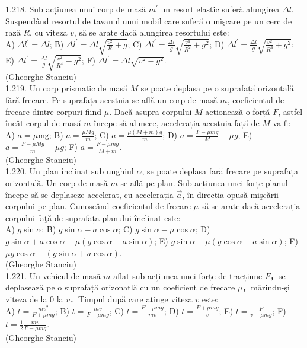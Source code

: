 {1.218. Sub acțiunea unui corp de masă $m^{\prime}$ un resort elastic suferă alungirea $\Delta l$. Suspendând resortul de tavanul unui mobil care suferă o mişcare pe un cerc de rază $R$, cu viteza $v$, să se arate dacă alungirea resortului este:\\ A) $\Delta l^{\prime}=\Delta l$; В) $\Delta l^{\prime}=\Delta l \sqrt{\frac{v^{2}}{R}+g}$; C) $\Delta l^{\prime}=\frac{\Delta l}{g} \sqrt{\frac{v^{4}}{R^{2}}+g^{2}}$; D) $\Delta l^{\prime}=\frac{\Delta l}{g} \sqrt{\frac{v^{2}}{R^{4}}+g^{2}}$; E) $\Delta l^{\prime}=\frac{\Delta l}{g} \sqrt{\frac{v^{2}}{R^{4}}-g^{2}}$; F) $\Delta l^{\prime}=\Delta l \sqrt{v^{2}-g^{2}}$.\\ (Gheorghe Stanciu)\\

1.219. Un corp prismatic de masă $M$ se poate deplasa pe o suprafață orizontală fără frecare. Pe suprafața acestuia se află un corp de masă $m$, coeficientul de frecare dintre corpuri fiind $\mu$. Dacă asupra corpului $M$ acționează o forță $F$, astfel încât corpul de masă $m$ începe să alunece, accelerația acestuia față de $M$ va fi:\\ A) $a=\mu \mathrm{mg}$; B) $a=\frac{\mu M g}{m}$; C) $a=\frac{\mu(M+m) g}{m}$; D) $a=\frac{F-\mu m g}{M}-\mu g$; E) $a=\frac{F-\mu M g}{m}-\mu g$; F) $a=\frac{F-\mu m g}{M+m}$.\\ (Gheorghe Stanciu)\\

1.220. Un plan înclinat sub unghiul $\alpha$, se poate deplasa fară frecare pe suprafața orizontală. Un corp de masă $m$ se află pe plan. Sub acțiunea unei forțe planul începe să se deplaseze accelerat, cu accelerația $\vec{a}$, în direcția opusă mişcării corpului pe plan. Cunoscând coeficientul de frecare $\mu$ să se arate dacă accelerația corpului faţă de suprafața planului înclinat este:\\ A) $g \sin \alpha$; B) $g \sin \alpha-a \cos \alpha$; C) $g \sin \alpha-\mu \cos \alpha$; D) $g \sin \alpha+a \cos \alpha-\mu(g \cos \alpha-a \sin \alpha)$; E) $g \sin \alpha-\mu(g \cos \alpha-a \sin \alpha)$; F) $\mu g \cos \alpha-(g \sin \alpha+a \cos \alpha)$.\\ (Gheorghe Stanciu)\\

1.221. Un vehicul de masã $m$ aflat sub acțiunea unei forțe de tracțiune $F$，se deplasează pe o suprafață orizonatlă cu un coeficient de frecare $\mu$，mărindu-şi viteza de la $0$ la $v$．Timpul după care atinge viteza $v$ este:\\ A) $t=\frac{m v^{2}}{F+\mu m g}$; B) $t=\frac{m v}{F-\mu m g}$; C) $t=\frac{F-\mu m g}{m v}$; D) $t=\frac{F+\mu m g}{v}$; E) $t=\frac{F}{v-\mu m g}$; F) $t=\frac{1}{2} \frac{m v}{F-\mu m g}$.\\ (Gheorghe Stanciu)\\

}
